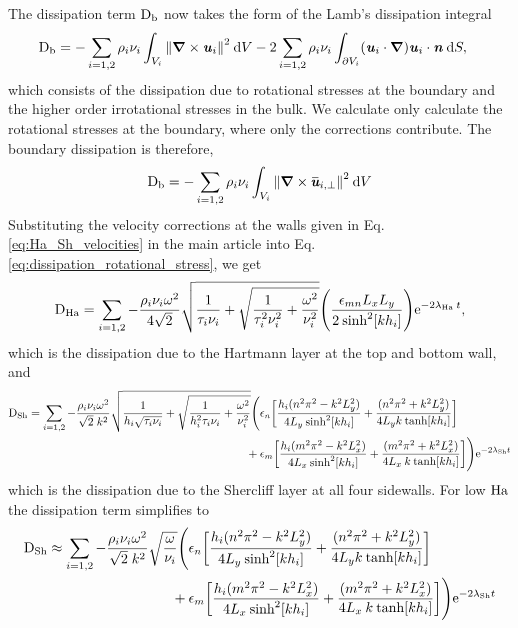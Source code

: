 \documentclass[aps,prfluids,reprint,superscriptaddress]{revtex4-2}
\newcommand{\h}[1]{\textbf{\textit{#1}}}
\newcommand{\ii}[1]{\text{#1}}
\newcommand{\nn}{\nonumber}
\newcommand{\overbar}[1]{\mkern 1.5mu\overline{\mkern-2mu#1\mkern-2mu}\mkern 1.5mu}
\newcommand{\meqref}[1]{{\hypersetup{linkcolor=black}\eqref{#1}}}
\numberwithin{equation}{section}
\begin{document}
The dissipation term $\ii D_{\rm b}$ now takes the form of the Lamb's dissipation integral
\begin{align}
	\ii D_{\rm b} &= 
	-\sum_{i=1,2} \rho_i\nu_i
	\int_{V_i} \norm{\bm\nabla \times \h u_i}^2  \: \mathrm dV
	-2 \sum_{i=1,2} \rho_i\nu_i
	\int_{\partial V_i} 
	(\h u_i \cdot \bm\nabla )\h u_i \cdot \h n \:\mathrm dS,
\end{align}
which consists of the dissipation due to rotational stresses at the boundary and the higher order irrotational stresses in the bulk. We calculate only calculate the rotational stresses at the boundary, where only the corrections contribute. The boundary dissipation is therefore,
\begin{equation}
	\ii D_{\rm b} = -\sum_{i=1,2} \rho_i\nu_i
	\int_{V_i} \norm{\bm\nabla \times \overbar{\h u}_{i,\perp}}^2  \: \mathrm dV
	\label{eq:dissipation_rotational_stress}
\end{equation}
Substituting the velocity corrections at the walls given in Eq.\,\meqref{eq:Ha_Sh_velocities} in the main article into Eq.\,\eqref{eq:dissipation_rotational_stress}, we get
\begin{equation}
	\ii D_{\rm Ha} = 
	\sum_{i=1,2}
	-\frac{\rho_i\nu_i\omega^2}{4\sqrt{2}}
	\sqrt{
		\dfrac{1}{\tau_i\nu_i} + 
		\sqrt{ \dfrac{1}{\tau_i^2\nu_i^2} + \dfrac{\omega^2}{\nu_i^2} } 
	}  
	\Biggl(
	\frac{\epsilon_{mn} L_xL_y}{2 \: \text{sinh}^2[kh_i]}
	\Biggr) \ii{e}^{-2\lambda_{\rm Ha}\: t},
\end{equation}
which is the dissipation due to the Hartmann layer at the top and bottom wall, and
\begin{align}
	\nn
	\ii D_{\rm Sh}  = 
	\sum_{i=1,2}
	-\frac{\rho_i\nu_i\omega^2}{\sqrt{2} \; k^2}
	\sqrt{ \frac{1}{h_i\sqrt{\tau_i\nu_i}} + 
		\sqrt{ \frac{1}{h_i^2\tau_i\nu_i} + \frac{\omega^2}{\nu_i^2}}}
	\Biggl(
	&\epsilon_n 
	\biggl[
	\frac{h_i(n^2\pi^2  - k^2L_y^2)}{4L_y\:\text{sinh}^2[kh_i]}
	+ \frac{(n^2\pi^2 + k^2L_y^2)}{4L_yk\:\text{tanh}[kh_i]}
	\biggr]
	\\
	 + \:
	&\epsilon_m
	\biggl[
	\frac{h_i(m^2\pi^2  - k^2L_x^2)}{4L_x\:\text{sinh}^2[kh_i]}
	+ \frac{(m^2\pi^2 + k^2L_x^2)}{4L_x \: k\:\text{tanh}[kh_i]}
	\biggr]
	\Biggr) \ii{e}^{-2\lambda_{\rm Sh} t}
\end{align}
which is the dissipation due to the Shercliff layer at all four sidewalls. For low $\rm Ha$ the dissipation term simplifies to
\begin{align}
	\nn
	\ii D_{\rm Sh} 
	\approx 
	\sum_{i=1,2}
	-\frac{\rho_i\nu_i\omega^2}{\sqrt{2} \; k^2}
	\sqrt{\frac{\omega}{\nu_i}}
	\Biggl(
	&\epsilon_n 
	\biggl[
	\frac{h_i(n^2\pi^2  - k^2L_y^2)}{4L_y\:\text{sinh}^2[kh_i]}
	+ \frac{(n^2\pi^2 + k^2L_y^2)}{4L_yk\:\text{tanh}[kh_i]}
	\biggr]
	\\
	+\:
	&\epsilon_m
	\biggl[
	\frac{h_i(m^2\pi^2  - k^2L_x^2)}{4L_x\:\text{sinh}^2[kh_i]}
	 + 
	\frac{(m^2\pi^2 + k^2L_x^2)}{4L_x \: k\:\text{tanh}[kh_i]}
	\biggr]
	\Biggr) \ii{e}^{-2\lambda_{\rm Sh} t}
\end{align}
\end{document}
